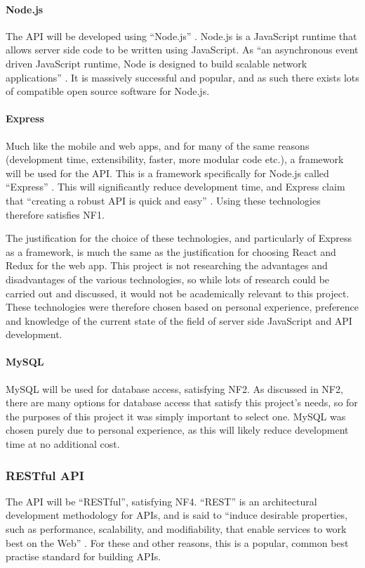 \documentclass[11pt,openright,a4paper]{report}
\begin{document}
\paragraph{Node.js}
The API will be developed using \enquote{Node.js} \parencite{nodejs}. Node.js is a JavaScript runtime that allows server side code to be written using JavaScript. As \enquote{an asynchronous event driven JavaScript runtime, Node is designed to build scalable network applications} \parencite{nodejsabout}. It is massively successful and popular, and as such there exists lots of compatible open source software for Node.js.

\paragraph{Express}
Much like the mobile and web apps, and for many of the same reasons (development time, extensibility, faster, more modular code etc.), a framework will be used for the API. This is a framework specifically for Node.js called \enquote{Express} \parencite{expressjs}. This will significantly reduce development time, and Express claim that \enquote{creating a robust API is quick and easy} \parencite{expressjs}. Using these technologies therefore satisfies NF1.

The justification for the choice of these technologies, and particularly of Express as a framework, is much the same as the justification for choosing React and Redux for the web app. This project is not researching the advantages and disadvantages of the various technologies, so while lots of research could be carried out and discussed, it would not be academically relevant to this project. These technologies were therefore chosen based on personal experience, preference and knowledge of the current state of the field of server side JavaScript and API development.

\paragraph{MySQL}
MySQL will be used for database access, satisfying NF2. As discussed in NF2, there are many options for database access that satisfy this project's needs, so for the purposes of this project it was simply important to select one. MySQL was chosen purely due to personal experience, as this will likely reduce development time at no additional cost.

\subsubsection{RESTful API}
The API will be \enquote{RESTful}, satisfying NF4. \enquote{REST} is an architectural development methodology for APIs, and is said to \enquote{induce desirable properties, such as performance, scalability, and modifiability, that enable services to work best on the Web} \parencite{oraclerest}. For these and other reasons, this is a popular, common best practise standard for building APIs.
\end{document}
